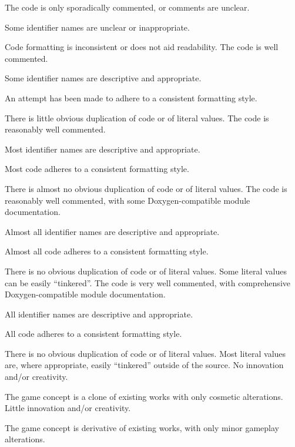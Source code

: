 \documentclass{../fal_assignment}
\begin{document}
\begin{markingrubric}
        \grade The code is only sporadically commented, or comments are unclear.
            \par Some identifier names are unclear or inappropriate.
            \par Code formatting is inconsistent or does not aid readability.
        \grade The code is well commented.
            \par Some identifier names are descriptive and appropriate.
            \par An attempt has been made to adhere to a consistent formatting style.
             \par There is little obvious duplication of code or of literal values.           
        \grade The code is reasonably well commented.
            \par Most identifier names are descriptive and appropriate.
            \par Most code adheres to a consistent formatting style.
             \par There is almost no obvious duplication of code or of literal values.   
        \grade The code is reasonably well commented, with some Doxygen-compatible module documentation.
            \par Almost all identifier names are descriptive and appropriate.
            \par Almost all code adheres to a consistent formatting style.
             \par There is no obvious duplication of code or of literal values. Some literal values can be easily ``tinkered''. 
        \grade The code is very well commented, with comprehensive Doxygen-compatible module documentation.
            \par All identifier names are descriptive and appropriate.
            \par All code adheres to a consistent formatting style.
             \par There is no obvious duplication of code or of literal values. Most literal values are, where appropriate, easily ``tinkered'' outside of the source.  
        \grade\fail No innovation and/or creativity.
            \par The game concept is a clone of existing works with only cosmetic alterations.
        \grade Little innovation and/or creativity.
            \par The game concept is derivative of existing works, with only minor gameplay alterations.

\end{markingrubric}
\end{document}
